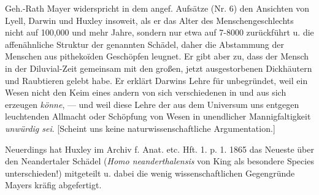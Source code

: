 \documentclass[a4paper, 11pt, oneside, english]{article}
\begin{document}
Geh.-Rath Mayer widerspricht in dem angef. Aufsätze (Nr. 6) den Ansichten von Lyell, Darwin und Huxley insoweit, als er das Alter des Menschengeschlechts nicht auf 100,000 und mehr Jahre, sondern nur etwa auf 7-8000 zurückführt u. die affenähnliche Struktur der genannten Schädel, daher die Abstammung der Menschen aus pithekoïden Geschöpfen leugnet. Er gibt aber zu, dass der Mensch in der Diluvial-Zeit gemeinsam mit den großen, jetzt ausgestorbenen Dickhäutern und Raubtieren gelebt habe. Er erklärt Darwins Lehre für unbegründet, weil ein Wesen nicht den Keim eines andern von sich verschiedenen in und aus sich erzeugen \emph{könne}, --- und weil diese Lehre der aus dem Universum uns entgegen leuchtenden Allmacht oder Schöpfung von Wesen in unendlicher Mannigfaltigkeit \emph{unwürdig sei}. [Scheint uns keine naturwissenschaftliche Argumentation.]

Neuerdings hat Huxley im Archiv f. Anat. etc. Hft. 1. p. 1. 1865 das Neueste über den Neandertaler Schädel (\emph{Homo neanderthalensis} von King als besondere Species unterschieden!) mitgeteilt u. dabei die wenig wissenschaftlichen Gegengründe Mayers kräfig abgefertigt.
\end{document}
